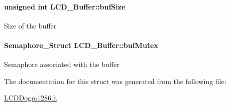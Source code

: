 \paragraph[{buf\+Size}]{\setlength{\rightskip}{0pt plus 5cm}unsigned int L\+C\+D\+\_\+\+Buffer\+::buf\+Size}\label{struct_l_c_d___buffer_a77c4adb59142a732371a552558161ebf}
Size of the buffer 
\paragraph[{buf\+Mutex}]{\setlength{\rightskip}{0pt plus 5cm}Semaphore\+\_\+\+Struct L\+C\+D\+\_\+\+Buffer\+::buf\+Mutex}\label{struct_l_c_d___buffer_a48816704d8fb2c059d0c4c2ce3234cd7}
Semaphore associated with the buffer 

The documentation for this struct was generated from the following file\+:\begin{DoxyCompactItemize}
\item 
\hyperlink{_l_c_d_dogm1286_8h}{L\+C\+D\+Dogm1286.\+h}\end{DoxyCompactItemize}
